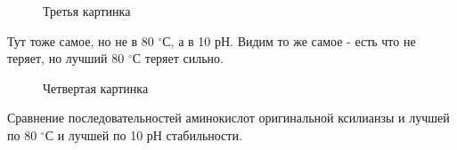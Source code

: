 \begin{figure}[H]\label{ul}
	\caption{Третья картинка}
\end{figure} 


Тут тоже самое, но не в 80 $^\circ$С, а в 10 рН. Видим то же самое -  есть что не теряет, но лучший 80 $^\circ$С теряет сильно.


\begin{figure}[H]\label{ul}
	\caption{Четвертая картинка}
\end{figure} 
Сравнение последовательностей аминокислот оригинальной ксилианзы и лучшей по 80 $^\circ$С и лучшей по 10 рН стабильности.